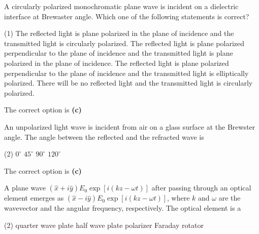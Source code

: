 \begin{enumerate}
\begin{minipage}{\textwidth}
	\item A circularly polarized monochromatic plane wave is incident on a dielectric interface at Brewaster angle. Which one of the following statements is correct?
\end{minipage}
\begin{tasks}(1)
	\task[\textbf{A.}] The reflected light is plane polarized in the plane of incidence and the transmitted light is circularly polarized.
	\task[\textbf{B.}]The reflected light is plane polarized perpendicular to the plane of incidence and the transmitted light is plane polarized in the plane of incidence.
	\task[\textbf{C.}]The reflected light is plane polarized perpendicular to the plane of incidence and the transmitted light is elliptically polarized.
	\task[\textbf{D.}]There will be no reflected light and the transmitted light is circularly polarized.
\end{tasks}
\begin{answer}
	The correct option is \textbf{(c)}	
\end{answer}
\begin{minipage}{\textwidth}
	\item An unpolarized light wave is incident from air on a glass surface at the Brewster angle. The angle between the reflected and the refracted wave is
\end{minipage}
\begin{tasks}(2)
	\task[\textbf{A.}] $0^{\circ}$
	\task[\textbf{B.}]$45^{\circ}$
	\task[\textbf{C.}]$90^{\circ}$
	\task[\textbf{D.}]$120^{\circ}$
\end{tasks}
\begin{answer}
	The correct option is \textbf{(c)}	
\end{answer}
\begin{minipage}{\textwidth}
	\item A plane wave $(\hat{x}+i \hat{y}) E_{0} \exp [i(k z-\omega t)]$ after passing through an optical element emerges as $(\hat{x}-i \hat{y}) E_{0} \exp [i(k z-\omega t)]$, where $k$ and $\omega$ are the wavevector and the angular frequency, respectively. The optical element is a
\end{minipage}
\begin{tasks}(2)
	\task[\textbf{A.}] quarter wave plate
	\task[\textbf{B.}] half wave plate
	\task[\textbf{C.}] polarizer
	\task[\textbf{D.}]Faraday rotator

\end{tasks}
\end{enumerate}
